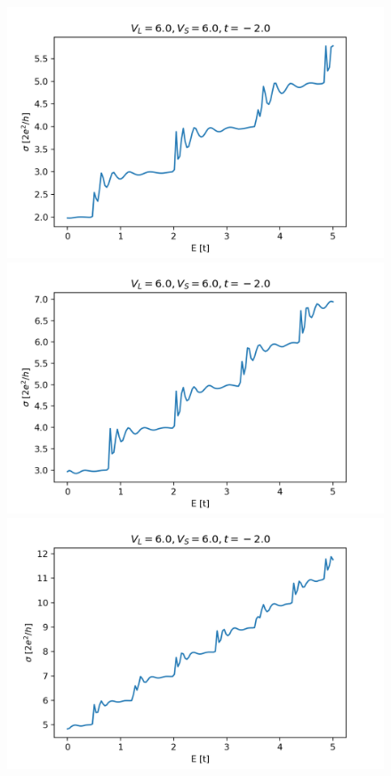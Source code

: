 \documentclass[12pt]{article}
\numberwithin{equation}{section}
\begin{document}
\begin{figure}
  \centering
  \begin{minipage}{0.333\textwidth}
      \centering
      \includegraphics[width=1.0\textwidth]{./media/cond_2deg_W4_L10_VL6_0_VS6_0.png} %
  \end{minipage}\hfill
  \begin{minipage}{0.333\textwidth}
      \centering
      \includegraphics[width=1.0\textwidth]{./media/cond_2deg_W5_L10_VL6_0_VS6_0.png} %
  \end{minipage}\hfill
  \begin{minipage}{0.333\textwidth}
    \centering
    \includegraphics[width=1.0\textwidth]{./media/cond_2deg_W8_L10_VL6_0_VS6_0.png} %

\end{minipage}
\end{figure}
\end{document}
